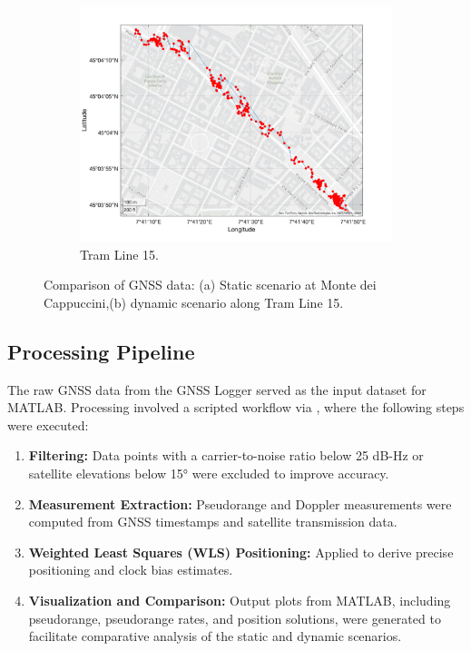 \begin{figure}[h!]
\begin{subfigure}{0.23\textwidth}
              \includegraphics[width=\textwidth]{images/Tram_15_trip_Castello_to_Pescatore/filtered/Samsung_A51_Tram_15_trip_Castello_to_Pescatore_fig6.png}
              \caption{Tram Line 15.}
              \label{fig:dynamic_scenario}
          \end{subfigure}
          \vspace{0.35cm}
          \caption{Comparison of GNSS data: (a) Static scenario at Monte dei Cappuccini,(b) dynamic scenario along Tram Line 15.}
          \label{fig:gnss_comparison}
        \end{figure}

    \subsection{Processing Pipeline}
    
        The raw GNSS data from the GNSS Logger served as the input dataset for MATLAB. 
        Processing involved a scripted workflow via , where the following steps were executed:
        
        \begin{enumerate}
            \item \textbf{Filtering:} Data points with a carrier-to-noise ratio below 25 dB-Hz or satellite elevations below 15° were excluded to improve accuracy.
            \item \textbf{Measurement Extraction:} Pseudorange and Doppler measurements were computed from GNSS timestamps and satellite transmission data.
            \item \textbf{Weighted Least Squares (WLS) Positioning:} Applied to derive precise positioning and clock bias estimates.
            \item \textbf{Visualization and Comparison:} Output plots from MATLAB, including pseudorange, pseudorange rates, and position solutions, were generated to facilitate comparative analysis of the static and dynamic scenarios.
        \end{enumerate}

